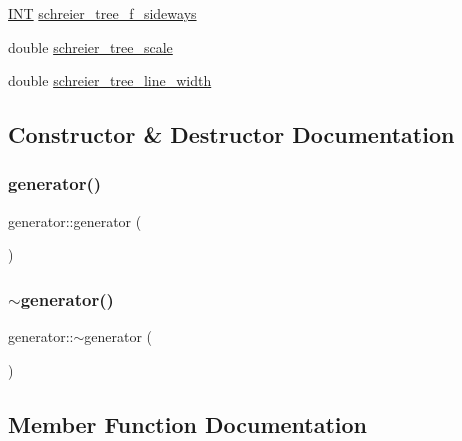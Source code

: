 \begin{DoxyCompactItemize}
$$\item 
\mbox{\hyperlink{galois_8h_a09fddde158a3a20bd2dcadb609de11dc}{I\+NT}} \mbox{\hyperlink{classgenerator_abc6b4ce2f3cfad37e7678465d2f0549d}{schreier\+\_\+tree\+\_\+f\+\_\+sideways}}
\item 
double \mbox{\hyperlink{classgenerator_afd4a2011fec8eb07d88a3e9d96b664a2}{schreier\+\_\+tree\+\_\+scale}}
\item 
double \mbox{\hyperlink{classgenerator_a1eabc81ab81ae3e3d9caef4cfc3a6914}{schreier\+\_\+tree\+\_\+line\+\_\+width}}
\end{DoxyCompactItemize}


\subsection{Constructor \& Destructor Documentation}
\mbox{\label{classgenerator_a474d415a403859769a80588f08048152}} 
\subsubsection{\texorpdfstring{generator()}{generator()}}
{\footnotesize\ttfamily generator\+::generator (\begin{DoxyParamCaption}{ }\end{DoxyParamCaption})}

\mbox{\label{classgenerator_aacffadcf27dfd1cf22bd4f33e1d7a35d}} 
\subsubsection{\texorpdfstring{$\sim$generator()}{~generator()}}
{\footnotesize\ttfamily generator\+::$\sim$generator (\begin{DoxyParamCaption}{ }\end{DoxyParamCaption})}



\subsection{Member Function Documentation}
\mbox{\label{classgenerator_ab5aeff022e487b444c93f75ccfaa6829}} 
